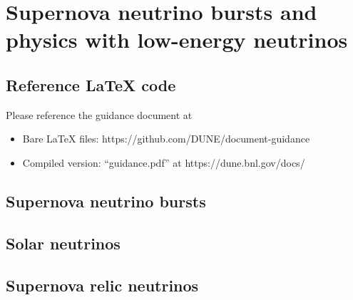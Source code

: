 \chapter{Supernova neutrino bursts and physics with low-energy neutrinos}
\label{ch:snb-lowe}


\section{Reference LaTeX code}

Please reference the guidance document at 

\begin{itemize}
\item Bare LaTeX files: https://github.com/DUNE/document-guidance
\item Compiled version: ``guidance.pdf'' at https://dune.bnl.gov/docs/
\end{itemize}


\section{Supernova neutrino bursts}
\label{sec:snb-lowe-snb}


\section{Solar neutrinos}
\label{sec:snb-lowe-solar}


\section{Supernova relic neutrinos}
\label{sec:snb-lowe-relic}



